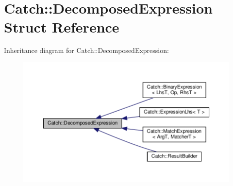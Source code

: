 \hypertarget{structCatch_1_1DecomposedExpression}{}\section{Catch\+:\+:Decomposed\+Expression Struct Reference}
\label{structCatch_1_1DecomposedExpression}


Inheritance diagram for Catch\+:\+:Decomposed\+Expression\+:\nopagebreak
\begin{figure}[H]
\begin{center}
\leavevmode
\includegraphics[width=350pt]{structCatch_1_1DecomposedExpression__inherit__graph}
\end{center}
\end{figure}

